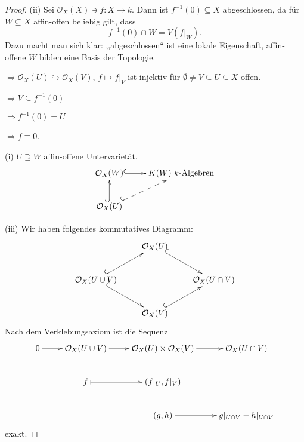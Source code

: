 \begin{proof}
  \mbox{}
\item[(ii)] Sei $\mathcal{O}_{X}(X)\ni f:X\rightarrow k$. Dann ist $f^{-1}(0)\subseteq X$
  abgeschlossen, da für $W\subseteq X$ affin-offen beliebig gilt, dass
  \[
    f^{-1}(0)\cap W=V(f|_{W}).
  \]
  Dazu macht man sich klar: ,,abgeschlossen`` ist eine lokale Eigenschaft,
  affin-offene $W$ bilden eine Basis der Topologie. 

  $\Rightarrow\mathcal{O}_{X}(U)\hookrightarrow\mathcal{O}_{X}(V)$, $f\mapsto f|_{V}$
  ist injektiv für $\emptyset\neq V\subseteq U\subseteq X$ offen.

  $\Rightarrow V\subseteq f^{-1}(0)$ 

  $\Rightarrow f^{-1}(0)=U$ 

  $\Rightarrow f\equiv0$.
\item[(i)] $U\supseteq W$ affin-offene Untervarietät.
  \[
    \xymatrix{
      \mathcal{O}_{X}(W) \ar@{^(->}[r] & K(W) \text{ } k\text{-Algebren} \\
      \mathcal{O}_{X}(U) \ar@{^(->}[u] \ar@{^(-->}[ru] &
    }
  \]
\item[(iii)] Wir haben folgendes kommutatives Diagramm:
  \[
    \xymatrix{
      {} & \mathcal{O}_{X}(U) \ar@{^(->}[rd] & \\
      \mathcal{O}_X(U\cup V) \ar@{^{(}->}[rd] \ar@{^{(}->}[ru] & {} & \mathcal{O}_X(U\cap V) \\
      {} & \mathcal{O}_X(V) \ar@{^{(}->}[ru] &
    }
  \]
  Nach dem Verklebungsaxiom ist die Sequenz
  \[
    \xymatrix{
      0 \ar[r] & \mathcal{O}_{X}(U\cup V) \ar[r] & \mathcal{O}_{X}(U) \times \mathcal{O}_{X}(V) \ar[r] & \mathcal{O}_{X}(U \cap V) \\
      {} & f \ar@{|->}[r] & (f|_{U}, f|_{V}) & {} \\
      {} & {} & (g,h) \ar@{|->}[r] & g|_{U \cap V} - h|_{U \cap V}
    }
  \]
  exakt.


\end{proof}
